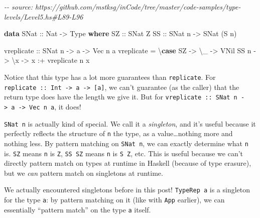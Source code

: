\documentclass[]{article}
\newenvironment{Shaded}{}{}
\newcommand{\CommentTok}[1]{\textcolor[rgb]{0.38,0.63,0.69}{\textit{#1}}}
\newcommand{\DataTypeTok}[1]{\textcolor[rgb]{0.56,0.13,0.00}{#1}}
\newcommand{\KeywordTok}[1]{\textcolor[rgb]{0.00,0.44,0.13}{\textbf{#1}}}
\newcommand{\NormalTok}[1]{#1}
\newcommand{\OperatorTok}[1]{\textcolor[rgb]{0.40,0.40,0.40}{#1}}
\newcommand{\OtherTok}[1]{\textcolor[rgb]{0.00,0.44,0.13}{#1}}
\begin{document}
\begin{Shaded}
\begin{Highlighting}[]
\CommentTok{{-}{-} source: https://github.com/mstksg/inCode/tree/master/code{-}samples/type{-}levels/Level5.hs\#L89{-}L96}

\KeywordTok{data} \DataTypeTok{SNat}\OtherTok{ ::} \DataTypeTok{Nat} \OtherTok{{-}\textgreater{}} \DataTypeTok{Type} \KeywordTok{where}
  \DataTypeTok{SZ}\OtherTok{ ::} \DataTypeTok{SNat} \DataTypeTok{Z}
  \DataTypeTok{SS}\OtherTok{ ::} \DataTypeTok{SNat}\NormalTok{ n }\OtherTok{{-}\textgreater{}} \DataTypeTok{SNat}\NormalTok{ (}\DataTypeTok{S}\NormalTok{ n)}

\OtherTok{vreplicate ::} \DataTypeTok{SNat}\NormalTok{ n }\OtherTok{{-}\textgreater{}}\NormalTok{ a }\OtherTok{{-}\textgreater{}} \DataTypeTok{Vec}\NormalTok{ n a}
\NormalTok{vreplicate }\OtherTok{=}\NormalTok{ \textbackslash{}}\KeywordTok{case}
  \DataTypeTok{SZ} \OtherTok{{-}\textgreater{}}\NormalTok{ \textbackslash{}\_ }\OtherTok{{-}\textgreater{}} \DataTypeTok{VNil}
  \DataTypeTok{SS}\NormalTok{ n }\OtherTok{{-}\textgreater{}}\NormalTok{ \textbackslash{}x }\OtherTok{{-}\textgreater{}}\NormalTok{ x }\OperatorTok{:+}\NormalTok{ vreplicate n x}
\end{Highlighting}
\end{Shaded}

Notice that this type has a lot more guarantees than \texttt{replicate}. For
\texttt{replicate\ ::\ Int\ -\textgreater{}\ a\ -\textgreater{}\ {[}a{]}}, we
can't guarantee (as the caller) that the return type does have the length we
give it. But for
\texttt{vreplicate\ ::\ SNat\ n\ -\textgreater{}\ a\ -\textgreater{}\ Vec\ n\ a},
it does!

\texttt{SNat\ n} is actually kind of special. We call it a \emph{singleton}, and
it's useful because it perfectly reflects the structure of \texttt{n} the type,
as a value\ldots nothing more and nothing less. By pattern matching on
\texttt{SNat\ n}, we can exactly determine what \texttt{n} is. \texttt{SZ} means
\texttt{n} is \texttt{Z}, \texttt{SS\ SZ} means \texttt{n} is \texttt{S\ Z},
etc. This is useful because we can't directly pattern match on types at runtime
in Haskell (because of type erasure), but we \emph{can} pattern match on
singletons at runtime.

We actually encountered singletons before in this post! \texttt{TypeRep\ a} is a
singleton for the type \texttt{a}: by pattern matching on it (like with
\texttt{App} earlier), we can essentially ``pattern match'' on the type
\texttt{a} itself.
\end{document}
